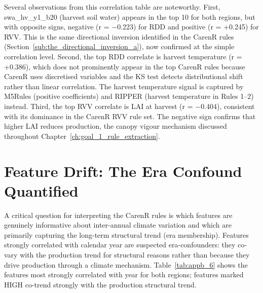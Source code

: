 Several observations from this correlation table are noteworthy. First, swa\_hv\_y1\_b20 (harvest soil water) appears in the top 10 for both regions, but with opposite signs, negative (r = $-$0.223) for RDD and positive (r = +0.245) for RVV. This is the same directional inversion identified in the CarenR rules (Section~\ref{sub:the_directional_inversion_a}), now confirmed at the simple correlation level. Second, the top RDD correlate is harvest temperature (r = +0.386), which does not prominently appear in the top CarenR rules because CarenR uses discretised variables and the KS test detects distributional shift rather than linear correlation. The harvest temperature signal is captured by M5Rules (positive coefficients) and RIPPER (harvest temperature in Rules 1--2) instead. Third, the top RVV correlate is LAI at harvest (r = $-$0.404), consistent with its dominance in the CarenR RVV rule set. The negative sign confirms that higher LAI reduces production, the canopy vigour mechanism discussed throughout Chapter~\ref{ch:goal_1_rule_extraction}.


\section{Feature Drift: The Era Confound Quantified}\label{app_sec:feature_drift_the_era}

A critical question for interpreting the CarenR rules is which features are genuinely informative about inter-annual climate variation and which are primarily capturing the long-term structural trend (era membership). Features strongly correlated with calendar year are suspected era-confounders: they co-vary with the production trend for structural reasons rather than because they drive production through a climate mechanism. Table~\ref{tab:appb_6} shows the features most strongly correlated with year for both regions; features marked HIGH co-trend strongly with the production structural trend.

